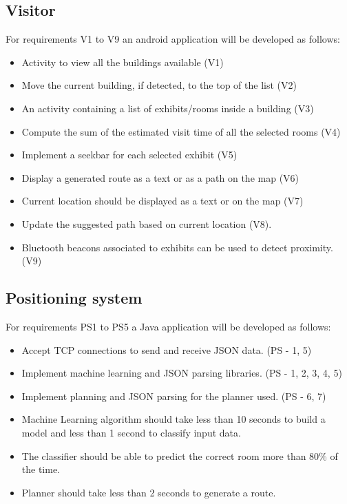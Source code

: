 \subsection{Visitor}
For requirements V1 to V9 an android application will be developed as follows:
	\begin{itemize}
		\item Activity to view all the buildings available (V1)
		\item Move the current building, if detected, to the top of the list (V2)
		\item An activity containing a list of exhibits/rooms inside a building (V3)
		\item Compute the sum of the estimated visit time of all the selected rooms (V4)
		\item Implement a seekbar for each selected exhibit (V5)
		\item Display a generated route as a text or as a path on the map (V6)
		\item Current location should be displayed as a text or on the map (V7)
		\item Update the suggested path based on current location (V8).
		\item Bluetooth beacons associated to exhibits can be used to detect proximity. (V9)
	\end{itemize}

\subsection{Positioning system}
For requirements PS1 to PS5 a Java application will be developed as follows:
	\begin{itemize}
		\item Accept TCP connections to send and receive JSON data. (PS - 1, 5)
		\item Implement machine learning and JSON parsing libraries. (PS - 1, 2, 3, 4, 5)
		\item Implement planning and JSON parsing for the planner used. (PS - 6, 7)
		\item Machine Learning algorithm should take less than 10 seconds to build a model and less than 1 second to classify input data.
		\item The classifier should be able to predict the correct room more than 80\% of the time.
		\item Planner should take less than 2 seconds to generate a route.
	\end{itemize}

